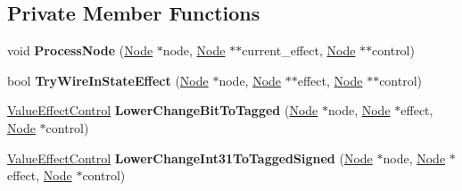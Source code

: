 \subsection*{Private Member Functions}
\begin{DoxyCompactItemize}
\item 
void {\bfseries Process\+Node} (\hyperlink{classv8_1_1internal_1_1compiler_1_1_node}{Node} $\ast$node, \hyperlink{classv8_1_1internal_1_1compiler_1_1_node}{Node} $\ast$$\ast$current\+\_\+effect, \hyperlink{classv8_1_1internal_1_1compiler_1_1_node}{Node} $\ast$$\ast$control)\hypertarget{classv8_1_1internal_1_1compiler_1_1_effect_control_linearizer_a932ad56912911e2bb011ddc0cde31a0d}{}\label{classv8_1_1internal_1_1compiler_1_1_effect_control_linearizer_a932ad56912911e2bb011ddc0cde31a0d}

\item 
bool {\bfseries Try\+Wire\+In\+State\+Effect} (\hyperlink{classv8_1_1internal_1_1compiler_1_1_node}{Node} $\ast$node, \hyperlink{classv8_1_1internal_1_1compiler_1_1_node}{Node} $\ast$$\ast$effect, \hyperlink{classv8_1_1internal_1_1compiler_1_1_node}{Node} $\ast$$\ast$control)\hypertarget{classv8_1_1internal_1_1compiler_1_1_effect_control_linearizer_adf58726813a88b9dd60549eb98bd22bc}{}\label{classv8_1_1internal_1_1compiler_1_1_effect_control_linearizer_adf58726813a88b9dd60549eb98bd22bc}

\item 
\hyperlink{structv8_1_1internal_1_1compiler_1_1_effect_control_linearizer_1_1_value_effect_control}{Value\+Effect\+Control} {\bfseries Lower\+Change\+Bit\+To\+Tagged} (\hyperlink{classv8_1_1internal_1_1compiler_1_1_node}{Node} $\ast$node, \hyperlink{classv8_1_1internal_1_1compiler_1_1_node}{Node} $\ast$effect, \hyperlink{classv8_1_1internal_1_1compiler_1_1_node}{Node} $\ast$control)\hypertarget{classv8_1_1internal_1_1compiler_1_1_effect_control_linearizer_aa824aa902f59214e7be83103fe69e704}{}\label{classv8_1_1internal_1_1compiler_1_1_effect_control_linearizer_aa824aa902f59214e7be83103fe69e704}

\item 
\hyperlink{structv8_1_1internal_1_1compiler_1_1_effect_control_linearizer_1_1_value_effect_control}{Value\+Effect\+Control} {\bfseries Lower\+Change\+Int31\+To\+Tagged\+Signed} (\hyperlink{classv8_1_1internal_1_1compiler_1_1_node}{Node} $\ast$node, \hyperlink{classv8_1_1internal_1_1compiler_1_1_node}{Node} $\ast$effect, \hyperlink{classv8_1_1internal_1_1compiler_1_1_node}{Node} $\ast$control)\hypertarget{classv8_1_1internal_1_1compiler_1_1_effect_control_linearizer_a9471d0ba5d3157384df2801bc056febc}{}\label{classv8_1_1internal_1_1compiler_1_1_effect_control_linearizer_a9471d0ba5d3157384df2801bc056febc}


\end{DoxyCompactItemize}
